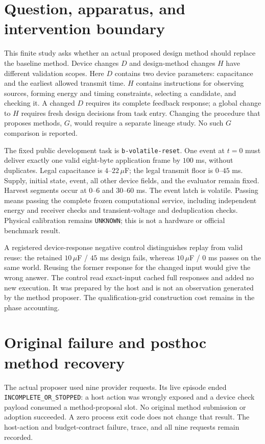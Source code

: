 \section{Question, apparatus, and intervention boundary}
This finite study asks whether an actual proposed design method should replace
the baseline method. Device changes $D$ and design-method changes $H$ have
different validation scopes. Here $D$ contains two device parameters: capacitance
and the earliest allowed transmit time. $H$ contains instructions for observing
sources, forming energy and timing constraints, selecting a candidate, and
checking it. A changed $D$ requires its complete feedback response; a global
change to $H$ requires fresh design decisions from task entry. Changing the
procedure that proposes methods, $G$, would require a separate lineage study.
No such $G$ comparison is reported.

The fixed public development task is \texttt{b-volatile-reset}. One event at
$t=0$ must deliver exactly one valid eight-byte application frame by $100$ ms,
without duplicates. Legal capacitance is $4$--$22\,\mu$F; the legal transmit floor
is $0$--$45$ ms. Supply, initial state, event, all other device fields, and the
evaluator remain fixed. Harvest segments occur at $0$--$6$ and $30$--$60$ ms.
The event latch is volatile. Passing means passing the complete frozen
computational service, including independent energy and receiver checks and
transient-voltage and deduplication checks. Physical calibration remains
\texttt{UNKNOWN}; this is not a hardware or official benchmark result.

A registered device-response negative control distinguishes replay from valid
reuse: the retained $10\,\mu$F / $45$ ms design fails, whereas
$10\,\mu$F / $0$ ms passes on the same world. Reusing the former response for the
changed input would give the wrong answer. The control read exact-input cached
full responses and added no new execution. It was prepared by the host and is
not an observation generated by the method proposer. The qualification-grid
construction cost remains in the phase accounting.

\clearpage
\section{Original failure and posthoc method recovery}
The actual proposer used nine provider requests. Its live episode ended
\texttt{INCOMPLETE\_OR\_STOPPED}: a host action was wrongly exposed and a device
check payload consumed a method-proposal slot. No original method submission
or adoption succeeded. A zero process exit code does not change that result.
The host-action and budget-contract failure, trace, and all nine requests remain
recorded.


